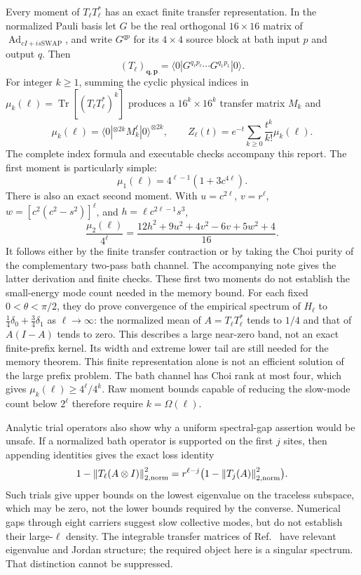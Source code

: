 \documentclass[11pt]{article}
\newcommand{\Tr}{\operatorname{Tr}}
\newcommand{\Ad}{\operatorname{Ad}}
\newcommand{\norm}[1]{\left\lVert#1\right\rVert}
\begin{document}
Every moment of $T_\ell T_\ell^*$ has an exact finite transfer representation.
In the normalized Pauli basis let $G$ be the real orthogonal $16\times16$
matrix of $\Ad_{cI+is\mathrm{SWAP}}$, and write $G^{qp}$ for its $4\times4$
source block at bath input $p$ and output $q$. Then
\[
 (T_\ell)_{\boldsymbol q,\boldsymbol p}
 =\langle0|G^{q_\ell p_\ell}\cdots G^{q_1p_1}|0\rangle.
\]
For integer $k\ge1$, summing the cyclic physical indices in
$\mu_k(\ell)=\Tr[(T_\ell T_\ell^*)^k]$ produces a $16^k\times16^k$
transfer matrix $M_k$ and
\[
 \mu_k(\ell)=\langle0|^{\otimes2k}M_k^\ell|0\rangle^{\otimes2k},
 \qquad
 Z_\ell(t)=e^{-t}\sum_{k\ge0}\frac{t^k}{k!}\mu_k(\ell).
\]
The complete index formula and executable checks accompany this report.
The first moment is particularly simple:
\[
 \mu_1(\ell)=4^{\ell-1}(1+3c^{4\ell}).
\]
There is also an exact second moment. With
$u=c^{2\ell}$, $v=r^\ell$, $w=[c^2(c^2-s^2)]^\ell$, and
$h=\ell c^{2\ell-1}s^3$,
\[
 \frac{\mu_2(\ell)}{4^\ell}
 =\frac{12h^2+9u^2+4v^2-6v+5w^2+4}{16}.
\]
It follows either by the finite transfer contraction or by taking the Choi
purity of the complementary two-pass bath channel. The accompanying note
gives the latter derivation and finite checks. These first two moments do
not establish the small-energy mode count needed in the memory bound.
For each fixed $0<\theta<\pi/2$, they do prove convergence of the empirical
spectrum of $H_\ell$ to $\tfrac14\delta_0+\tfrac34\delta_1$ as
$\ell\to\infty$: the normalized mean of $A=T_\ell T_\ell^*$ tends to
$1/4$ and that of $A(I-A)$ tends to zero. This describes a large near-zero
band, not an exact finite-prefix kernel. Its width and extreme lower tail
are still needed for the memory theorem.
This finite representation alone is not an efficient solution of the large
prefix problem. The bath channel has Choi rank at most four, which gives
$\mu_k(\ell)\ge4^\ell/4^k$. Raw moment bounds capable of reducing the
slow-mode count below $2^\ell$ therefore require $k=\Omega(\ell)$.

Analytic trial operators also show why a uniform spectral-gap assertion would
be unsafe. If a normalized bath operator is supported on the first $j$ sites,
then appending identities gives the exact loss identity
\[
 1-\norm{T_\ell(A\otimes I)}_{2,\rm norm}^2
 =r^{\ell-j}\bigl(1-\norm{T_j(A)}_{2,\rm norm}^2\bigr).
\]
Such trials give upper bounds on the lowest eigenvalue on the traceless
subspace, which may be zero, not the lower bounds required by the converse.
Numerical gaps through eight carriers
suggest slow collective modes, but do not establish their large-$\ell$
density. The integrable transfer matrices of Ref.~\cite{claeys} have relevant
eigenvalue and Jordan structure; the required object here is a singular
spectrum. That distinction cannot be suppressed.
\end{document}
